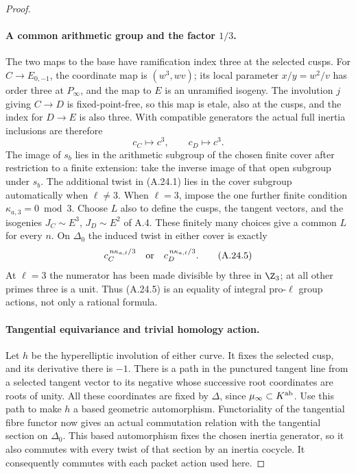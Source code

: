 \begin{proof}
\paragraph{A common arithmetic group and the factor $1/3$.}
The two maps to the base have ramification index three at the
selected cusps. For $C\to E_{0,-1}$, the coordinate map is
$(w^3,wv)$; its local parameter $x/y=w^2/v$ has order three
at $P_\infty$, and the map to $E$ is an unramified isogeny.
The involution $j$ giving $C\to D$ is fixed-point-free, so this
map is etale, also at the cusps, and the index for $D\to E$
is also three. With compatible generators the actual full
inertia inclusions are therefore
\[
                 c_C\longmapsto c^3,\qquad
                 c_D\longmapsto c^3.                    \tag{A.24.4}
\]
The image of $s_b$ lies in the arithmetic subgroup of the
chosen finite cover after restriction to a finite extension:
take the inverse image of that open subgroup under $s_b$.
The additional twist in (A.24.1) lies in the cover subgroup
automatically when $\ell\ne3$. When $\ell=3$, impose the one
further finite condition $\kappa_{a,3}=0\bmod3$.
Choose $L$ also to define the cusps, the tangent vectors, and
the isogenies $J_C\sim E^3$, $J_D\sim E^2$ of A.4.
These finitely many choices give a common $L$ for every $n$.
On $\Delta_0$ the induced twist in either cover is exactly
\[
                  c_C^{\,n\kappa_{a,\ell}/3}
             \quad\hbox{or}\quad
                  c_D^{\,n\kappa_{a,\ell}/3}.             \tag{A.24.5}
\]
At $\ell=3$ the numerator has been made divisible by three
in $\Z_3$; at all other primes three is a unit. Thus (A.24.5)
is an equality of integral pro-$\ell$ group actions, not
only a rational formula.

\paragraph{Tangential equivariance and trivial homology action.}
Let $h$ be the hyperelliptic involution of either curve.
It fixes the selected cusp, and its derivative there is $-1$.
There is a path in the punctured tangent line from a selected
tangent vector to its negative whose successive root
coordinates are roots of unity. All these coordinates are
fixed by $\Delta$, since $\mu_\infty\subset K^{\rm ab}$.
Use this path to make $h$ a based geometric automorphism.
Functoriality of the tangential fibre functor now gives an
actual commutation relation with the tangential section on
$\Delta_0$. This based automorphism fixes the chosen inertia
generator, so it also commutes with every twist of that
section by an inertia cocycle. It consequently commutes with
each packet action used here.


\end{proof}
